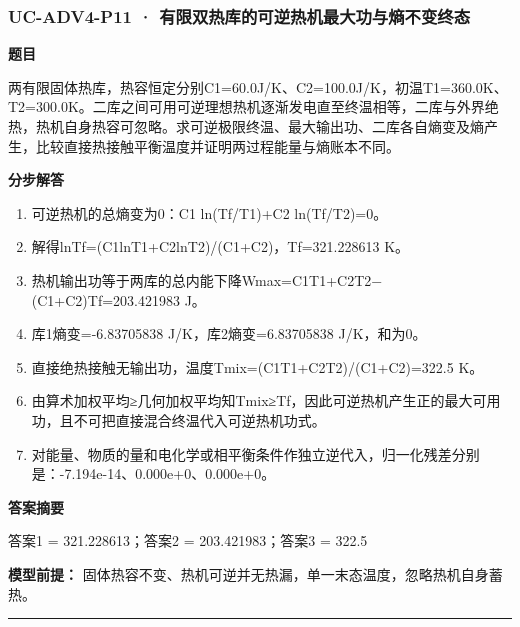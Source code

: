 \documentclass[UTF8,11pt,a4paper]{ctexart}
\begin{document}
\subsubsection*{UC-ADV4-P11 · 有限双热库的可逆热机最大功与熵不变终态}
\noindent\textbf{题目}\par
两有限固体热库，热容恒定分别C1=60.0J/K、C2=100.0J/K，初温T1=360.0K、T2=300.0K。二库之间可用可逆理想热机逐渐发电直至终温相等，二库与外界绝热，热机自身热容可忽略。求可逆极限终温、最大输出功、二库各自熵变及熵产生，比较直接热接触平衡温度并证明两过程能量与熵账本不同。\par
\medskip\noindent\textbf{分步解答}
\begin{enumerate}
\item 可逆热机的总熵变为0：C1 ln(Tf/T1)+C2 ln(Tf/T2)=0。
\item 解得lnTf=(C1lnT1+C2lnT2)/(C1+C2)，Tf=321.228613 K。
\item 热机输出功等于两库的总内能下降Wmax=C1T1+C2T2−(C1+C2)Tf=203.421983 J。
\item 库1熵变=-6.83705838 J/K，库2熵变=6.83705838 J/K，和为0。
\item 直接绝热接触无输出功，温度Tmix=(C1T1+C2T2)/(C1+C2)=322.5 K。
\item 由算术加权平均≥几何加权平均知Tmix≥Tf，因此可逆热机产生正的最大可用功，且不可把直接混合终温代入可逆热机功式。
\item 对能量、物质的量和电化学或相平衡条件作独立逆代入，归一化残差分别是：-7.194e-14、0.000e+0、0.000e+0。
\end{enumerate}
\noindent\textbf{答案摘要}\par
答案1 = 321.228613；答案2 = 203.421983；答案3 = 322.5\par
\noindent\textbf{模型前提：}
固体热容不变、热机可逆并无热漏，单一末态温度，忽略热机自身蓄热。\par
\medskip\hrule\medskip
{}
\end{document}
